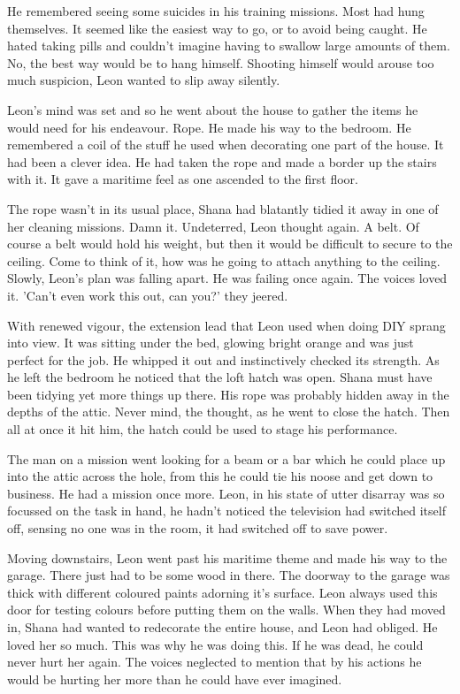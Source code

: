 He remembered seeing some suicides in his training missions.  Most had hung themselves.  It seemed like the easiest way to go, or to avoid being caught.  He hated taking pills and couldn't imagine having to swallow large amounts of them.  No, the best way would be to hang himself.  Shooting himself would arouse too much suspicion, Leon wanted to slip away silently.

Leon's mind was set and so he went about the house to gather the items he would need for his endeavour.  Rope.  He made his way to the bedroom.  He remembered a coil of the stuff he used when decorating one part of the house.  It had been a clever idea.  He had taken the rope and made a border up the stairs with it.  It gave a maritime feel as one ascended to the first floor.

The rope wasn't in its usual place,  Shana had blatantly tidied it away in one of her cleaning missions.  Damn it.  Undeterred, Leon thought again.  A belt.  Of course a belt would hold his weight, but then it would be difficult to secure to the ceiling.  Come to think of it, how was he going to attach anything to the ceiling.  Slowly, Leon's plan was falling apart.  He was failing once again.  The voices loved it.  'Can't even work this out, can you?' they jeered.

With renewed vigour, the extension lead that Leon used when doing DIY sprang into view.  It was sitting under the bed, glowing bright orange and was just perfect for the job.  He whipped it out and instinctively checked its strength.  As he left the bedroom he noticed that the loft hatch was open.  Shana must have been tidying yet more things up there.  His rope was probably hidden away in the depths of the attic.  Never mind, the thought, as he went to close the hatch.  Then all at once it hit him, the hatch could be used to stage his performance.

The man on a mission went looking for a beam or a bar which he could place up into the attic across the hole, from this he could tie his noose and get down to business.  He had a mission once more.  Leon, in his state of utter disarray was so focussed on the task in hand, he hadn't noticed the television had switched itself off,  sensing no one was in the room, it had switched off to save power.

Moving downstairs, Leon went past his maritime theme and made his way to the garage.  There just had to be some wood in there.  The doorway to the garage was thick with different coloured paints adorning it's surface.  Leon always used this door for testing colours before putting them on the walls.  When they had moved in, Shana had wanted to redecorate the entire house, and Leon had obliged.  He loved her so much.  This was why he was doing this.  If he was dead, he could never hurt her again.  The voices neglected to mention that by his actions he would be hurting her more than he could have ever imagined.

